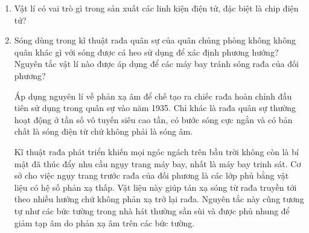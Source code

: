
\setcounter{section}{0}
\begin{enumerate}[label=\bfseries Câu \arabic*:]
	\item {}
	
	{
		Vật lí có vai trò gì trong sản xuất các linh kiện điện tử, đặc biệt là chip điện tử?
	}
	
	
	\item {}
	
	
	{
		Sóng dùng trong kĩ thuật rađa quân sự của quân chủng phòng không không quân khác gì với sóng được cá heo sử dụng để xác định phương hướng? Nguyên tắc vật lí nào được áp dụng để các máy bay tránh sóng rađa của đối phương?
	}
	
	\hideall
	{
		Áp dụng nguyên lí về phản xạ âm để chế tạo ra chiếc rađa hoàn chỉnh đầu tiên sử dụng trong quân sự vào năm 1935. Chỉ khác là rađa quân sự thường hoạt động ở tần số vô tuyến siêu cao tần, có bước sóng cực ngắn và có bản chất là sóng điện từ chứ không phải là sóng âm. 
		
		Kĩ thuật rađa phát triển khiến mọi ngóc ngách trên bầu trời không còn là bí mật đã thúc đẩy nhu cầu ngụy trang máy bay, nhất là máy bay trinh sát. Cơ sở cho việc ngụy trang trước rađa của đối phương là các lớp phủ bằng vật liệu có hệ số phản xạ thấp. Vật liệu này giúp tán xạ sóng từ rađa truyền tới theo nhiều hướng chứ không phản xạ trở lại rađa. Nguyên tắc này cũng tương tự như các bức tường trong nhà hát thường sần sùi và được phủ nhung để giảm tạp âm do phản xạ âm trên các bức tường.
		
}
\end{enumerate}
